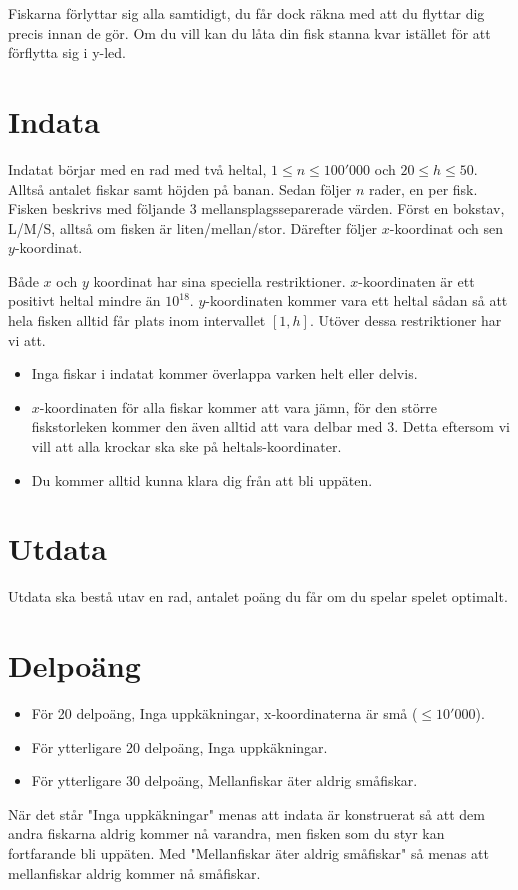 Fiskarna förlyttar sig alla samtidigt, du får dock räkna med att du flyttar dig
precis innan de gör. Om du vill kan du låta din fisk stanna kvar istället för
att förflytta sig i y-led.

\section*{Indata}

Indatat börjar med en rad med två heltal, $1 \leq n \leq 100'000$ och $20 \leq h \leq 50$. Alltså antalet fiskar samt höjden på banan. Sedan följer $n$ rader, en per fisk. Fisken beskrivs med följande 3 mellansplagsseparerade värden. Först en bokstav, L/M/S, alltså om fisken är liten/mellan/stor. Därefter följer $x$-koordinat och sen $y$-koordinat.

Både $x$ och $y$ koordinat har sina speciella restriktioner. $x$-koordinaten är ett positivt heltal mindre än $10^18$. $y$-koordinaten kommer vara ett heltal sådan så att hela fisken alltid får plats inom intervallet $[1, h]$. Utöver dessa restriktioner har vi att.

\begin{itemize}
  \item
    Inga fiskar i indatat kommer överlappa varken helt eller delvis.
  \item
    $x$-koordinaten för alla fiskar kommer att vara jämn, för den större fiskstorleken kommer den även alltid att vara delbar med 3. Detta eftersom vi vill att alla krockar ska ske på heltals-koordinater.
  \item
    Du kommer alltid kunna klara dig från att bli uppäten.
\end{itemize}

\section*{Utdata}

Utdata ska bestå utav en rad, antalet poäng du får om du spelar spelet optimalt.

\section*{Delpoäng}

\begin{itemize}
    \item För 20 delpoäng, Inga uppkäkningar, x-koordinaterna är små ($\leq 10'000$).
    \item För ytterligare 20 delpoäng, Inga uppkäkningar.
    \item För ytterligare 30 delpoäng, Mellanfiskar äter aldrig småfiskar.
\end{itemize}

När det står "Inga uppkäkningar" menas att indata är konstruerat så att dem andra fiskarna aldrig kommer nå varandra, men fisken som du styr kan fortfarande bli uppäten. Med "Mellanfiskar äter aldrig småfiskar" så menas att mellanfiskar aldrig kommer nå småfiskar.
